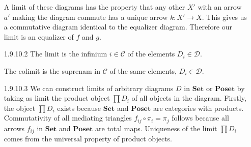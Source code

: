\documentclass{article}
\newcommand{\cset}{\mathbf{Set}}
\newcommand{\cposet}{\mathbf{Poset}}
\begin{document}
\begin{enumerate}
  \hfill{}
  
  A limit of these diagrams has the property that any other $X'$ with an arrow $a'$ making the diagram commute has a unique arrow $k : X' \rightarrow X$.
  This gives us a commutative diagram identical to the equalizer diagram.
  Therefore our limit is an equalizer of $f$ and $g$.
  \begin{center}
  \end{center}
  
\newpage
\item[1.9.10.2]
  The limit is the infinium $i\in \mathcal{C}$
  of the elements $D_i\in \mathcal{D}$.

  The colimit is the suprenam in $\mathcal{C}$ of
  the same elements, $D_i \in \mathcal{D}$.

\item[]
\item[1.9.10.3]
  We can construct limits of arbitrary diagrams $D$ in $\cset$ or $\cposet$ by taking as limit the product object $\prod D_i$ of all objects in the diagram.
  Firstly, the object $\prod D_i$ exists because $\cset$ and $\cposet$ are categories with products.
  Commutativity of all mediating triangles $f_{ij} \circ \pi_i = \pi_j$ follows because all arrows $f_{ij}$ in $\cset$ and $\cposet$ are total maps.
  Uniqueness of the limit $\prod D_i$ comes from the universal property of product objects.
  \begin{center}
\end{center}
\end{enumerate}
\end{document}
